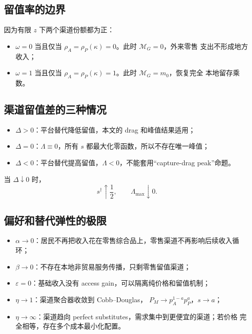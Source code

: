 \documentclass[UTF8,11pt,scheme=chinese,fontset=fandol]{ctexart}
\newcommand{\MG}{\mathcal M_G}
\theoremstyle{definition}
\begin{document}
\subsection{留值率的边界}

因为有限 \(z\) 下两个渠道份额都为正：
\begin{itemize}
  \item \(\omega=0\) 当且仅当 \(\rho_A=\rho_P(\kappa)=0\)。此时 \(\MG=0\)，外来零售
  支出不形成地方收入；
  \item \(\omega=1\) 当且仅当 \(\rho_A=\rho_P(\kappa)=1\)。此时 \(\MG=m_0\)，恢复完全
  本地留存乘数。
\end{itemize}

\subsection{渠道留值差的三种情况}

\begin{itemize}
  \item \(\Delta>0\)：平台替代降低留值，本文的 drag 和峰值结果适用；
  \item \(\Delta=0\)：\(\Lambda\equiv0\)，所有 \(s\) 都最大化零函数，所以不存在唯一峰值；
  \item \(\Delta<0\)：平台替代提高留值，\(\Lambda<0\)，不能套用“capture-drag peak”命题。
\end{itemize}

当 \(\Delta\downarrow0\) 时，
\[
s^\dagger\uparrow\frac12,
\qquad
\Lambda_{\max}\downarrow0.
\]

\subsection{偏好和替代弹性的极限}

\begin{itemize}
  \item \(\alpha\to0\)：居民不再把收入花在零售综合品上，零售渠道不再影响后续收入循环；
  \item \(\beta\to0\)：不存在本地非贸易服务传播，只剩零售留值渠道；
  \item \(\varepsilon=0\)：基础收入没有 access gain，可以隔离纯价格和留值机制；
  \item \(\eta\to1\)：渠道聚合器收敛到 Cobb--Douglas，
  \(P_M\to p_A^{1-a}p_P^a\)，\(s\to a\)；
  \item \(\eta\to\infty\)：渠道趋向 perfect substitutes，需求集中到更便宜的渠道；若价格
  完全相等，存在多个成本最小化配置。
\end{itemize}
\end{document}
